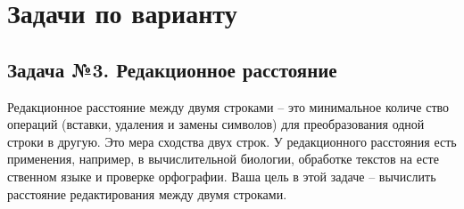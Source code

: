 

\section{Задачи по варианту}
\subsection{Задача №3. Редакционное расстояние}
Редакционное расстояние между двумя строками – это минимальное количе ство операций (вставки, удаления и замены символов) для преобразования одной строки в другую. Это мера сходства двух строк. У редакционного расстояния есть применения, например, в вычислительной биологии, обработке текстов на есте ственном языке и проверке орфографии. Ваша цель в этой задаче – вычислить расстояние редактирования между двумя строками. 
